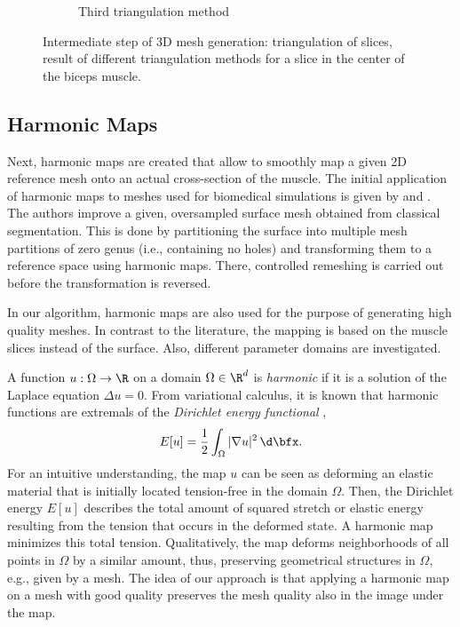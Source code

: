 \begin{figure}
\begin{subfigure}[t]{0.32\textwidth}
    \caption{Third triangulation method}%
    \label{fig:triangulation_2}%
  \end{subfigure}
  \caption{Intermediate step of 3D mesh generation: triangulation of slices, result of different triangulation methods for a slice in the center of the biceps muscle.}%
  \label{fig:triangulations}%
\end{figure}%

\subsection{Harmonic Maps}

Next, harmonic maps are created that allow to smoothly map a given 2D reference mesh onto an actual cross-section of the muscle. The initial application of harmonic maps to meshes used for biomedical simulations is given by \cite{marchandise2010quality} and \cite{Marchandise2_2011}. The authors improve a given, oversampled surface mesh obtained from classical segmentation. This is done by partitioning the surface into multiple mesh partitions of zero genus (i.e., containing no holes) and transforming them to a reference space using harmonic maps. There, controlled remeshing is carried out before the transformation is reversed.

In our algorithm, harmonic maps are also used for the purpose of generating high quality meshes. In contrast to the literature, the mapping is based on the muscle slices instead of the surface. Also, different parameter domains are investigated.

A function $u: \Omega \to \R$ on a domain $\Omega \in \R^d$ is \emph{harmonic} if it is a solution of the Laplace equation $Δu = 0$.
From variational calculus, it is known that harmonic functions are extremals of the \emph{Dirichlet energy functional} \cite{weyl1940},
\begin{align*}
  E[u] = \dfrac12 \int_\Omega |\nabla u|^2 \,\d\bfx.
\end{align*}
For an intuitive understanding, the map $u$ can be seen as deforming an elastic material that is initially located tension-free in the domain $\Omega$.
Then, the Dirichlet energy $E[u]$ describes the total amount of squared stretch or elastic energy resulting from the tension that occurs in the deformed state. A harmonic map minimizes this total tension. Qualitatively, the map deforms neighborhoods of all points in $\Omega$ by a similar amount, thus, preserving geometrical structures in $\Omega$, e.g., given by a mesh. The idea of our approach is that 
applying a harmonic map on a mesh with good quality preserves the mesh quality also in the image under the map.

